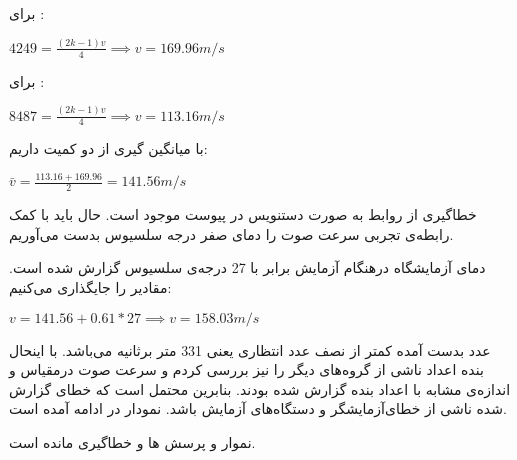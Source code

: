 \documentclass{article}
\begin{document}
برای  : 
\begin{center}
$ 4249 = \frac{(2k-1)v}{4} \implies v = 169.96  m/s$
\end{center}
برای  : 
\begin{center}
$ 8487 = \frac{(2k-1)v}{4} \implies v = 113.16  m/s$
\end{center}
با میانگین گیری از دو کمیت داریم:
\begin{center}
$\bar{v} = \frac{113.16 + 169.96}{2} = 141.56  m/s$
\end{center}

خطاگیری از روابط به صورت دستنویس در پیوست موجود است.
حال باید با کمک رابطه‌ی تجربی  سرعت صوت را دمای صفر درجه سلسیوس بدست می‌آوریم.

دمای آزمایشگاه درهنگام آزمایش برابر با 27 درجه‌ی سلسیوس گزارش شده است. مقادیر را جایگذاری می‌کنیم:

$v = 141.56 + 0.61*27 \implies v = 158.03 m/s$

عدد بدست آمده کمتر از نصف عدد انتظاری یعنی 331 متر برثانیه می‌باشد. با اینحال بنده اعداد ناشی از گروه‌های دیگر را نیز بررسی  کردم و سرعت صوت درمقیاس و اندازه‌ی مشابه با اعداد بنده گزارش شده بودند. بنابرین محتمل است که خطای گزارش شده ناشی از خطای‌آزمایشگر و دستگاه‌های آزمایش باشد.
نمودار در ادامه آمده است.

نموار و پرسش ها و خطاگیری مانده است.
\end{document}
